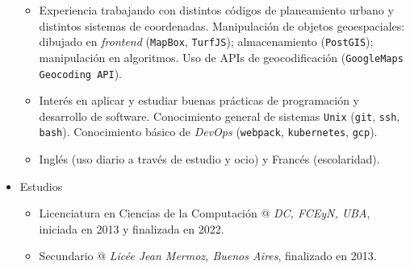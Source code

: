 \documentclass[a4paper]{article}
\begin{document}
\begin{itemize}
\begin{itemize}
    \item
      Experiencia trabajando con distintos códigos de planeamiento urbano y
      distintos sistemas de coordenadas.
      Manipulación de objetos geoespaciales: dibujado en \textit{frontend}
      (\texttt{MapBox}, \texttt{TurfJS}); almacenamiento (\texttt{PostGIS});
      manipulación en algoritmos. \newline
      Uso de APIs de geocodificación (\texttt{GoogleMaps Geocoding API}).

    \item
      Interés en aplicar y estudiar buenas prácticas de programación y
      desarrollo de software. \newline
      Conocimiento general de sistemas \texttt{Unix} (\texttt{git},
      \texttt{ssh}, \texttt{bash}).
      Conocimiento básico de \textit{DevOps} (\texttt{webpack},
      \texttt{kubernetes}, \texttt{gcp}).

    \item
      Inglés (uso diario a través de estudio y ocio) y Francés (escolaridad).

  \end{itemize}

  \item Estudios
  \begin{itemize}

    \item
      Licenciatura en Ciencias de la Computación @ \textit{DC, FCEyN, UBA},
      iniciada en 2013 y finalizada en 2022.

    \item
      Secundario @ \textit{Licée Jean Mermoz, Buenos Aires}, finalizado en
      2013.

  \end{itemize}

\end{itemize}
\end{document}
